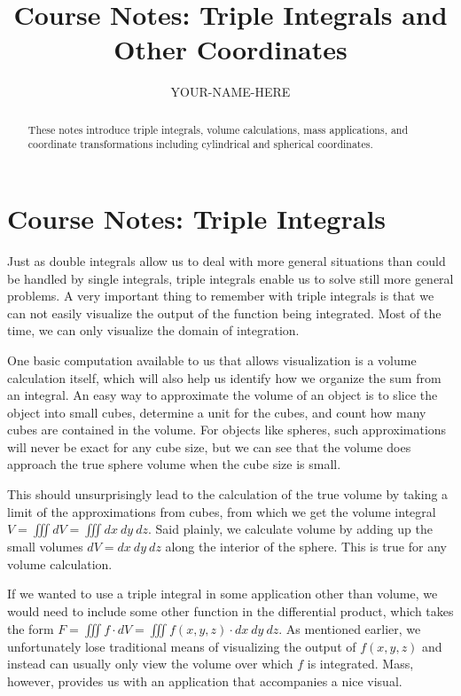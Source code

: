\documentclass{ximera}
\title{Course Notes: Triple Integrals and Other Coordinates}
\author{YOUR-NAME-HERE}
\begin{document}
\begin{abstract}
These notes introduce triple integrals, volume calculations, mass applications, and coordinate transformations including cylindrical and spherical coordinates.
\end{abstract}
\maketitle

\section{Course Notes: Triple Integrals}

Just as double integrals allow us to deal with more general situations than could be handled by single integrals, triple integrals enable us to solve still more general problems. A very important thing to remember with triple integrals is that we can not easily visualize the output of the function being integrated. Most of the time, we can only visualize the domain of integration.

One basic computation available to us that allows visualization is a volume calculation itself, which will also help us identify how we organize the sum from an integral. An easy way to approximate the volume of an object is to slice the object into small cubes, determine a unit for the cubes, and count how many cubes are contained in the volume. For objects like spheres, such approximations will never be exact for any cube size, but we can see that the volume does approach the true sphere volume when the cube size is small.

This should unsurprisingly lead to the calculation of the true volume by taking a limit of the approximations from cubes, from which we get the volume integral $V=\iiint dV=\iiint dx\ dy\ dz$. Said plainly, we calculate volume by adding up the small volumes $dV=dx\ dy\ dz$ along the interior of the sphere. This is true for any volume calculation.

If we wanted to use a triple integral in some application other than volume, we would need to include some other function in the differential product, which takes the form $F=\iiint f\cdot dV=\iiint f(x,y,z)\cdot dx\ dy\ dz$. As mentioned earlier, we unfortunately lose traditional means of visualizing the output of $f(x,y,z)$ and instead can usually only view the volume over which $f$ is integrated. Mass, however, provides us with an application that accompanies a nice visual.
\end{document}
